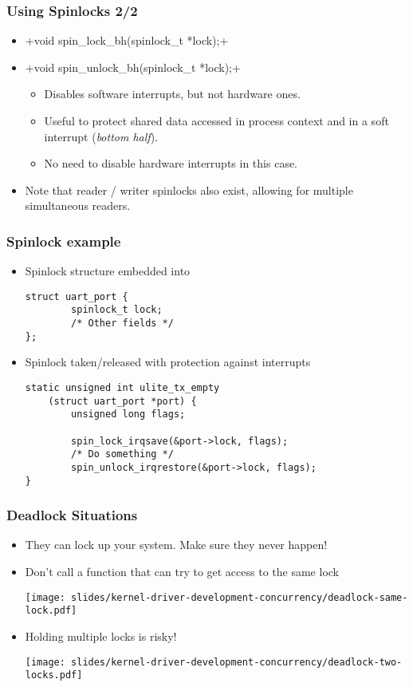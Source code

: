 \begin{frame}[fragile]
  \frametitle{Using Spinlocks 2/2}
  \begin{itemize}
  \item {}+void spin_lock_bh(spinlock_t *lock);+
  \item {}+void spin_unlock_bh(spinlock_t *lock);+
    \begin{itemize}
    \item Disables software interrupts, but not hardware ones.
    \item Useful to protect shared data accessed in process context
      and in a soft interrupt (\emph{bottom half}).
    \item No need to disable hardware interrupts in this case.
    \end{itemize}
  \item Note that reader / writer spinlocks also exist, allowing
	for multiple simultaneous readers.
  \end{itemize}
\end{frame}

\begin{frame}[fragile]
  \frametitle{Spinlock example}
  \begin{itemize}
  \item Spinlock structure embedded into 
    \begin{verbatim}
struct uart_port {
        spinlock_t lock;
        /* Other fields */
};
    \end{verbatim}
  \item Spinlock taken/released with protection against interrupts
    \begin{verbatim}
static unsigned int ulite_tx_empty
    (struct uart_port *port) {
        unsigned long flags;

        spin_lock_irqsave(&port->lock, flags);
        /* Do something */
        spin_unlock_irqrestore(&port->lock, flags);
}
    \end{verbatim}
  \end{itemize}
\end{frame}

\begin{frame}
  \frametitle{Deadlock Situations}
  \begin{itemize}
  \item They can lock up your system. Make sure they never happen!
  \item Don't call a function that can try to get access to the same
    lock
    \begin{center}
      \texttt{[image: slides/kernel-driver-development-concurrency/deadlock-same-lock.pdf]}
    \end{center}
  \item Holding multiple locks is risky!
    \begin{center}
      \texttt{[image: slides/kernel-driver-development-concurrency/deadlock-two-locks.pdf]}
    \end{center}
  \end{itemize}
\end{frame}

